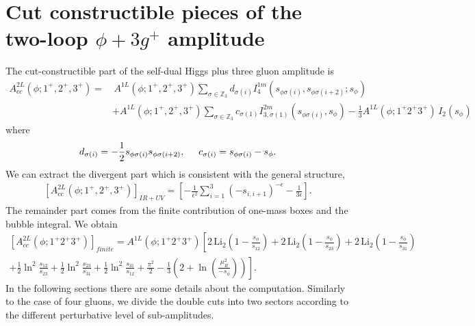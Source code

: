 \chapter{Cut constructible pieces of the two-loop $\phi+3g^+$ amplitude} \label{phi+3g}
The cut-constructible part of the self-dual Higgs plus three gluon amplitude is
\begin{align*}
A^{2L}_{cc}(\phi;1^+,2^+,3^+)=&\, A^{1L}(\phi;1^+,2^+,3^+)\sum_{\sigma\in \mathbb{Z}_3} d_{\sigma(i)} I_{4}^{1m}(s_{\phi\sigma(i)},s_{\phi\sigma(i+2)};s_\phi)\\&+A^{1L}(\phi;1^+,2^+,3^+)\sum_{\sigma\in \mathbb{Z}_3} c_{\sigma(1)} I_{3,\sigma(1)}^{2m}(s_{\phi\sigma(i)},s_{\phi}) -\frac{1}{3} A^{1L}(\phi;1^+2^+3^+)\, I_2(s_\phi)
\end{align*}
where
\begin{align*}
	d_{\sigma(i)}=-\frac{1}{2}s_{\phi \sigma(i)}s_{\phi\sigma(i+2)}, \hspace{0.5cm}c_{\sigma(i)}=s_{\phi\sigma(i)}-s_\phi.
\end{align*}
We can extract the divergent part which is consistent with the general structure,
\begin{align*}
	\left[A^{2L}_{cc}(\phi;1^+,2^+,3^+)\right]_{IR+UV}=\left[-\frac{1}{\epsilon^2}\sum_{i=1}^3 \left(-s_{i,i+1}\right)^{-\epsilon}-\frac{1}{3\epsilon}\right].
\end{align*}
The remainder part comes from the finite contribution of one-mass boxes and the bubble integral. We obtain
\begin{align*}
	\left[A^{2L}_{cc}(\phi;1^+2^+3^+)\right]_{finite}=A^{1L}(\phi;1^+2^+3^+)\left[2\,\text{Li}_2\left(1-\frac{s_\phi}{s_{12}}\right)+2\,\text{Li}_2\left(1-\frac{s_\phi}{s_{23}}\right)+2\,\text{Li}_2\left(1-\frac{s_\phi}{s_{31}}\right) \right.\\ \left.
+\frac{1}{2}\ln^2\frac{s_{12}}{s_{23}}+\frac{1}{2}\ln^2\frac{s_{23}}{s_{31}}+\frac{1}{2}\ln^2\frac{s_{31}}{s_{12}}+\frac{\pi^2}{2}-\frac{1}{3}\left(2+\ln\left(\frac{\mu_R^2}{-s_\phi}\right)\right)\right].
\end{align*}
In the following sections there are some details about the computation. Similarly to the case of four gluons, we divide the double cuts into two sectors according to the different perturbative level of sub-amplitudes.
